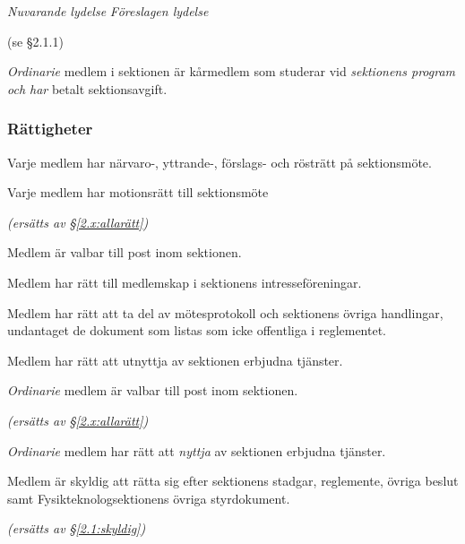 \documentclass{article}
\newenvironment{lydelse}
    {\begin{paracol}{2}%
        \emph{Nuvarande lydelse}%
        \switchcolumn%
        \emph{Föreslagen lydelse}%
    \end{paracol}%
    \begin{enumerate}[label=\thesubsection.\arabic*]%
    \begin{paracol}{2}%
    }{\end{paracol}\end{enumerate}}
\begin{document}
\begin{lydelse}
    (se \S 2.1.1)

  \switchcolumn
    \item \emph{Ordinarie} medlem i sektionen är kårmedlem som studerar vid \emph{sektionens program och har} betalt sektionsavgift.

    \subsubsection*{Rättigheter}
  \switchcolumn*
  \setcounter{subsection}{2}
    \item Varje medlem har närvaro-, yttrande-, förslags- och rösträtt på sektionsmöte.
   
    \item Varje medlem har motionsrätt till sektionsmöte
    
  \switchcolumn
    \item[] \emph{(ersätts av \S\ref{2.x:allarätt})} 

  \switchcolumn*

    \item Medlem är valbar till post inom sektionen.

    \item Medlem har rätt till medlemskap i sektionens intresseföreningar.

    \item Medlem har rätt att ta del av mötesprotokoll och sektionens övriga handlingar, undantaget de dokument som listas som icke offentliga i reglementet.
    
    \item Medlem har rätt att utnyttja av sektionen erbjudna tjänster.
    
  \switchcolumn
    
    \item \emph{Ordinarie} medlem är valbar till post inom sektionen.
    \label{S:OrdinarieMedlem}
    
    \item[] \emph{(ersätts av \S\ref{2.x:allarätt})}
    
    \item \emph{Ordinarie} medlem har rätt att \emph{nyttja} av sektionen erbjudna tjänster.
    
    
  \switchcolumn*
  \setcounter{subsection}{3}
  \setcounter{enumi}{0}
    \item Medlem är skyldig att rätta sig efter sektionens stadgar, regle\-mente, övriga beslut samt Fysikteknologsektionens övriga styrdokument.
    
  \switchcolumn
    \emph{(ersätts av \S \ref{2.1:skyldig})}
\end{lydelse}
\end{document}
